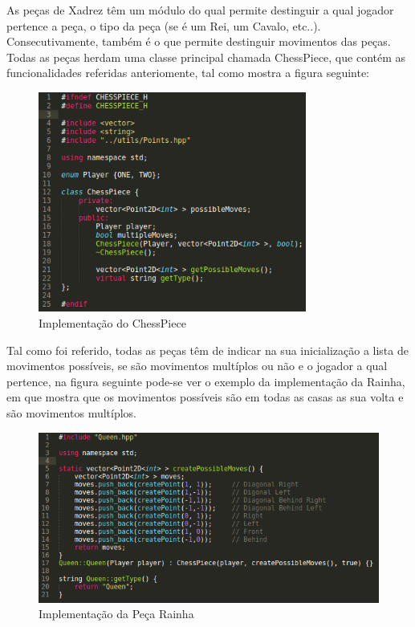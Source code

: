 \documentclass[11pt,a4paper]{report}
\begin{document}
As peças de Xadrez têm um módulo do qual permite destinguir a qual jogador pertence a peça, o tipo da peça (se é um Rei, um Cavalo, etc..). Consecutivamente, também é o que permite destinguir movimentos das peças.\\

Todas as peças herdam uma classe principal chamada ChessPiece, que contém as funcionalidades referidas anteriomente, tal como mostra a figura seguinte:

\begin{figure}[H]
\centerline{\includegraphics[width=250pt]{images/chesspiece.png}}
\caption{Implementação do ChessPiece}
\label{img:complete}
\end{figure}

Tal como foi referido, todas as peças têm de indicar na sua inicialização a lista de movimentos possíveis, se são movimentos multíplos ou não e o jogador a qual pertence, na figura seguinte pode-se ver o exemplo da implementação da Rainha, em que mostra que os movimentos possíveis são em todas as casas as sua volta e são movimentos multíplos.

\begin{figure}[H]
\centerline{\includegraphics[width=380pt]{images/queen.png}}
\caption{Implementação da Peça Rainha}
\label{img:complete}
\end{figure}
\end{document}
